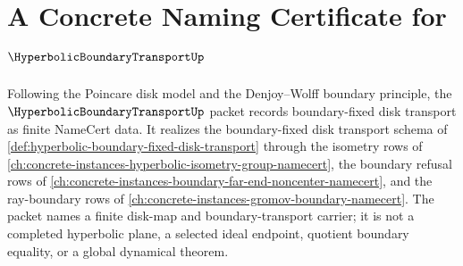 \chapter{A Concrete Naming Certificate for $\HyperbolicBoundaryTransportUp$}
\label{ch:concrete-instances-hyperbolic-boundary-transport-namecert}

Following the Poincare disk model and the Denjoy--Wolff boundary principle, the $\HyperbolicBoundaryTransportUp$ packet records boundary-fixed disk transport as finite NameCert data. It realizes the boundary-fixed disk transport schema of \autoref{def:hyperbolic-boundary-fixed-disk-transport} through the isometry rows of \autoref{ch:concrete-instances-hyperbolic-isometry-group-namecert}, the boundary refusal rows of \autoref{ch:concrete-instances-boundary-far-end-noncenter-namecert}, and the ray-boundary rows of \autoref{ch:concrete-instances-gromov-boundary-namecert}. The packet names a finite disk-map and boundary-transport carrier; it is not a completed hyperbolic plane, a selected ideal endpoint, quotient boundary equality, or a global dynamical theorem.

